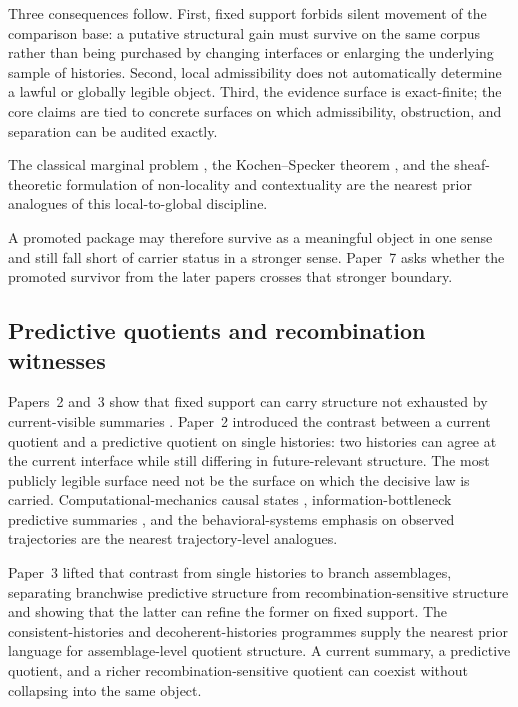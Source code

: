 \documentclass[11pt]{article}
\theoremstyle{definition}
\begin{document}
Three consequences follow. First, fixed support forbids silent movement of the
comparison base: a putative structural gain must survive on the same corpus rather than
being purchased by changing interfaces or enlarging the underlying sample of histories.
Second, local admissibility does not automatically determine a lawful or globally
legible object. Third, the evidence surface is exact-finite; the core claims are tied
to concrete surfaces on which admissibility, obstruction, and separation can be audited
exactly.

The classical marginal problem \citep{Fine1982}, the Kochen--Specker theorem
\citep{KochenSpecker1967}, and the sheaf-theoretic formulation of non-locality and
contextuality \citep{AbramskyBrandenburger2011} are the nearest prior analogues
of this local-to-global discipline.

A promoted package may therefore survive as a meaningful object in one sense and still
fall short of carrier status in a stronger sense. Paper~7 asks whether the promoted
survivor from the later papers crosses that stronger boundary.

\subsection{Predictive quotients and recombination witnesses}

Papers~2 and~3 show that fixed support can carry structure not exhausted by
current-visible summaries
\citep{Tsiokos2026HolonomyMemory,Tsiokos2026MarkingErasureRecombination}. Paper~2
introduced the contrast between a current quotient and a predictive quotient on single
histories: two histories can agree at the current interface while still differing in
future-relevant structure. The most publicly legible surface need not be the surface on
which the decisive law is carried. Computational-mechanics causal states
\citep{ShaliziCrutchfield2001}, information-bottleneck predictive summaries
\citep{TishbyPereiraBialek1999}, and the behavioral-systems emphasis on observed
trajectories \citep{Willems1991} are the nearest trajectory-level analogues.

Paper~3 lifted that contrast from single histories to branch assemblages, separating
branchwise predictive structure from recombination-sensitive structure and showing that
the latter can refine the former on fixed support. The consistent-histories
\citep{Griffiths1984} and decoherent-histories \citep{GellMannHartle1990} programmes
supply the nearest prior language for assemblage-level quotient structure. A current
summary, a predictive quotient, and a richer recombination-sensitive quotient can
coexist without collapsing into the same object.
\end{document}
